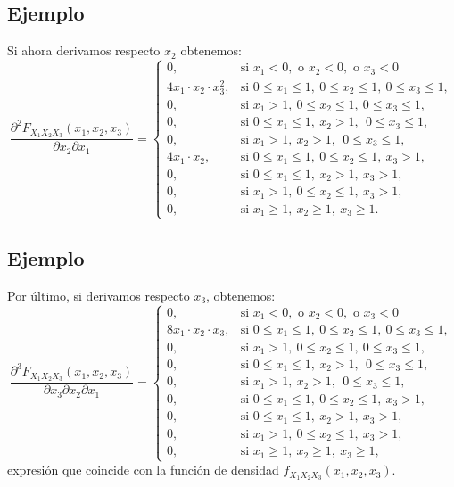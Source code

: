 \documentclass[]{book}
\begin{document}
\hypertarget{ejemplo-115}{%
\subsection{Ejemplo}\label{ejemplo-115}}

Si ahora derivamos respecto \(x_2\) obtenemos:
\[
\frac{\partial^2 F_{X_1X_2X_3}(x_1,x_2,x_3)}{\partial x_2\partial x_1}=\begin{cases}
0, & \mbox{si }x_1<0,\mbox{ o }x_2<0,\mbox{ o }x_3 <0\\
4 x_1\cdot x_2\cdot x_3^2, & \mbox{si }0\leq x_1\leq 1,\ 0\leq x_2\leq 1,\ 0\leq x_3\leq 1, \\
 0, & \mbox{si }x_1> 1,\ 0\leq x_2\leq  1,\ 0\leq x_3\leq  1, \\
 0, & \mbox{si }0\leq x_1\leq  1,\ x_2> 1,\ \ 0\leq x_3\leq  1, \\
 0, & \mbox{si }x_1> 1,\ x_2> 1,\ \ 0\leq x_3\leq  1, \\
 4 x_1\cdot x_2, & \mbox{si }0\leq x_1\leq  1,\ 0\leq x_2\leq  1,\ x_3> 1,\\
 0, & \mbox{si }0\leq x_1\leq  1,\ x_2 >  1,\ x_3> 1,\\
 0, & \mbox{si }x_1>1,\ 0\leq x_2\leq  1,\ x_3> 1,\\
0, & \mbox{si }x_1\geq 1,\ x_2\geq 1,\ x_3\geq 1.
\end{cases}
\]

\hypertarget{ejemplo-116}{%
\subsection{Ejemplo}\label{ejemplo-116}}

Por último, si derivamos respecto \(x_3\), obtenemos:
\[
\frac{\partial^3 F_{X_1X_2X_3}(x_1,x_2,x_3)}{\partial x_3\partial x_2\partial x_1}=\begin{cases}
0, & \mbox{si }x_1<0,\mbox{ o }x_2<0,\mbox{ o }x_3 <0\\
8 x_1\cdot x_2\cdot x_3, & \mbox{si }0\leq x_1\leq 1,\ 0\leq x_2\leq 1,\ 0\leq x_3\leq 1, \\
 0, & \mbox{si }x_1> 1,\ 0\leq x_2\leq  1,\ 0\leq x_3\leq  1, \\
 0, & \mbox{si }0\leq x_1\leq  1,\ x_2> 1,\ \ 0\leq x_3\leq  1, \\
 0, & \mbox{si }x_1> 1,\ x_2> 1,\ \ 0\leq x_3\leq  1, \\
 0, & \mbox{si }0\leq x_1\leq  1,\ 0\leq x_2\leq  1,\ x_3> 1,\\
 0, & \mbox{si }0\leq x_1\leq  1,\ x_2 >  1,\ x_3> 1,\\
 0, & \mbox{si }x_1>1,\ 0\leq x_2\leq  1,\ x_3> 1,\\
0, & \mbox{si }x_1\geq 1,\ x_2\geq 1,\ x_3\geq 1,
\end{cases}
\]
expresión que coincide con la función de densidad \(f_{X_1X_2X_3}(x_1,x_2,x_3)\).
\end{document}
